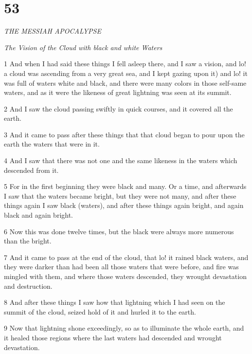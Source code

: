 \chapter{53}

\par \textit{THE MESSIAH APOCALYPSE}

\par \textit{The Vision of the Cloud with black and white Waters}


\par 1 And when I had said these things I fell asleep there, and I saw a vision, and lo! a cloud was ascending from a very great sea, and I kept gazing upon it) and lo! it was full of waters white and black, and there were many colors in those self-same waters, and as it were the likeness of great lightning was seen at its summit. 

\par 2 And I saw the cloud passing swiftly in quick courses, and it covered all the earth. 

\par 3 And it came to pass after these things that that cloud began to pour upon the earth the waters that were in it. 

\par 4 And I saw that there was not one and the same like­ness in the waters which descended from it. 

\par 5 For in the first beginning they were black and many. Or a time, and afterwards I saw that the waters became bright, but they were not many, and after these things again I saw black (waters), and after these things again bright, and again black and again bright. 

\par 6 Now this was done twelve times, but the black were always more numerous than the bright. 

\par 7 And it came to pass at the end of the cloud, that lo! it rained black waters, and they were darker than had been all those waters that were before, and fire was mingled with them, and where those waters descended, they wrought devastation and destruction. 

\par 8 And after these things I saw how that lightning which I had seen on the summit of the cloud, seized hold of it and hurled it to the earth. 

\par 9 Now that lightning shone exceedingly, so as to illuminate the whole earth, and it healed those regions where the last waters had descended and wrought devastation. 

